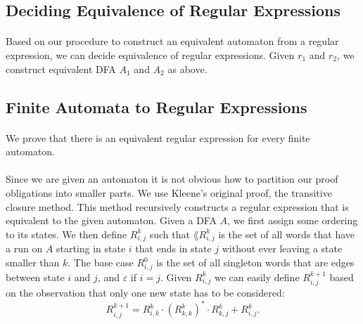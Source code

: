 \documentclass[11pt,a4paper,oneside]{book}
\begin{document}
            \subsection{Deciding Equivalence of Regular Expressions}

                \paragraph{} 
                    Based on our procedure to construct an equivalent automaton from a regular expression, we can decide equivalence of regular expressions. Given $r_1$ and $r_2$, we construct equivalent DFA $A_1$ and $A_2$ as above.
                    

            \subsection{Finite Automata to Regular Expressions}
                \paragraph{}
                    We prove that there is an equivalent regular expression for every finite automaton.

                
                \paragraph{}
                    Since we are given an automaton it is not obvious how to partition our proof obligations into smaller parts.
                    We use Kleene's original proof, the transitive closure method. 
                    This method recursively constructs a regular expression that is equivalent to the given automaton.
                    Given a DFA $A$, we first assign some ordering to its states. We then define $R^k_{i,j}$ such that 
                    $\lang{R^k_{i,j}}$ is the set of all words that have a run on $A$ starting in state $i$ that ends in state $j$ without ever leaving a state smaller than $k$. 
                    The base case $R^{0}_{i,j}$ is the set of all singleton words that are edges between state $i$ and $j$, and $\varepsilon$ if $i=j$. 
                    Given $R^k_{i,j}$ we can easily define $R^{k+1}_{i,j}$ based on the observation that only one new state has to be considered:
                    \[
                        R^{k+1}_{i,j} = R^{k}_{i,k} \cdot (R^{k}_{k,k})^* \cdot R^{k}_{k,j} + R^{k}_{i,j}.
                    \]
\end{document}
